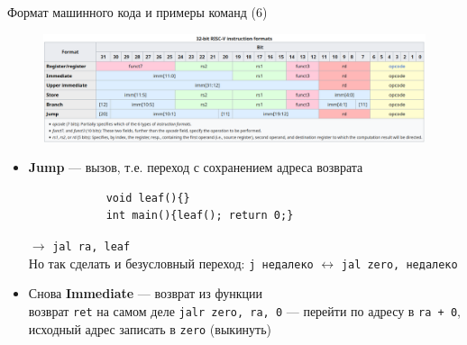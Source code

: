 \documentclass[xetex,aspectratio=43]{beamer}
\begin{document}
\begin{frame}[fragile]{Формат машинного кода и примеры команд (6)}
    \begin{figure}
        \includegraphics[width=1\linewidth]{img/12.RISCV_instruction_format_wikipedia}
    \end{figure}

    \begin{itemize}
        \tightlist
        \item \textbf{Jump} --- вызов, т.е. переход с сохранением адреса возврата\\
        \begin{verbatim}
            void leaf(){}
            int main(){leaf(); return 0;}
        \end{verbatim}
        $\rightarrow$ \texttt{jal ra, leaf}\\
        Но так сделать и безусловный переход: \texttt{j недалеко} $\leftrightarrow$ \texttt{jal zero, недалеко}
        \item Снова \textbf{Immediate} --- возврат из функции \\
        возврат \texttt{ret} на самом деле \texttt{jalr zero, ra, 0} --- перейти по
        адресу в \texttt{ra + 0}, исходный адрес записать в \texttt{zero} (выкинуть)
    \end{itemize}
\end{frame}
\end{document}
